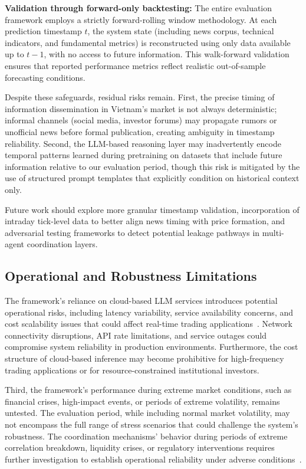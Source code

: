 \documentclass{ieeeaccess}
\begin{document}
\textbf{Validation through forward-only backtesting:} The entire evaluation framework employs a strictly forward-rolling window methodology. At each prediction timestamp $t$, the system state (including news corpus, technical indicators, and fundamental metrics) is reconstructed using only data available up to $t-1$, with no access to future information. This walk-forward validation ensures that reported performance metrics reflect realistic out-of-sample forecasting conditions.

Despite these safeguards, residual risks remain. First, the precise timing of information dissemination in Vietnam's market is not always deterministic; informal channels (social media, investor forums) may propagate rumors or unofficial news before formal publication, creating ambiguity in timestamp reliability. Second, the LLM-based reasoning layer may inadvertently encode temporal patterns learned during pretraining on datasets that include future information relative to our evaluation period, though this risk is mitigated by the use of structured prompt templates that explicitly condition on historical context only.

Future work should explore more granular timestamp validation, incorporation of intraday tick-level data to better align news timing with price formation, and adversarial testing frameworks to detect potential leakage pathways in multi-agent coordination layers.

\subsection{Operational and Robustness Limitations}
The framework's reliance on cloud-based LLM services introduces potential operational risks, including latency variability, service availability concerns, and cost scalability issues that could affect real-time trading applications~\cite{qiu2020pre}. Network connectivity disruptions, API rate limitations, and service outages could compromise system reliability in production environments. Furthermore, the cost structure of cloud-based inference may become prohibitive for high-frequency trading applications or for resource-constrained institutional investors.

Third, the framework's performance during extreme market conditions, such as financial crises, high-impact events, or periods of extreme volatility, remains untested. The evaluation period, while including normal market volatility, may not encompass the full range of stress scenarios that could challenge the system's robustness. The coordination mechanisms' behavior during periods of extreme correlation breakdown, liquidity crises, or regulatory interventions requires further investigation to establish operational reliability under adverse conditions~\cite{cont2001empirical}.
\end{document}
